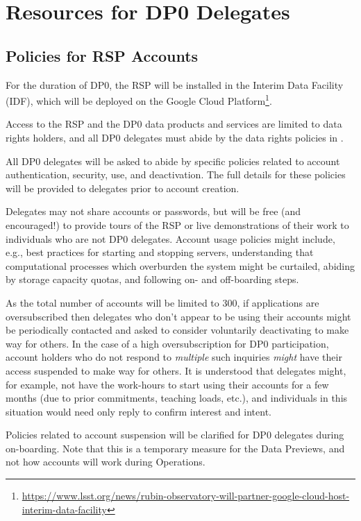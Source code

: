 \documentclass[DM,lsstdraft,authoryear,toc]{lsstdoc}
\begin{document}
\section{Resources for DP0 Delegates}\label{sec:res}

\subsection{Policies for RSP Accounts}\label{ssec:res_pol}

For the duration of DP0, the RSP will be installed in the Interim Data Facility (IDF), which will be deployed on the Google Cloud Platform\footnote{\url{https://www.lsst.org/news/rubin-observatory-will-partner-google-cloud-host-interim-data-facility}}.

Access to the RSP and the DP0 data products and services are limited to data rights holders, and all DP0 delegates must abide by the data rights policies in .

All DP0 delegates will be asked to abide by specific policies related to account authentication, security, use, and deactivation.
The full details for these policies will be provided to delegates prior to account creation. 

Delegates may not share accounts or passwords, but will be free (and encouraged!) to provide tours of the RSP or live demonstrations of their work to individuals who are not DP0 delegates.
Account usage policies might include, e.g., best practices for starting and stopping servers, understanding that computational processes which overburden the system might be curtailed, abiding by storage capacity quotas, and following on- and off-boarding steps.

As the total number of accounts will be limited to 300, if applications are oversubscribed then delegates who don't appear to be using their accounts might be periodically contacted and asked to consider voluntarily deactivating to make way for others.
In the case of a high oversubscription for DP0 participation, account holders who do not respond to \emph{multiple} such inquiries \emph{might} have their access suspended to make way for others.
It is understood that delegates might, for example, not have the work-hours to start using their accounts for a few months (due to prior commitments, teaching loads, etc.), and individuals in this situation would need only reply to confirm interest and intent. 

Policies related to account suspension will be clarified for DP0 delegates during on-boarding.
Note that this is a temporary measure for the Data Previews, and not how accounts will work during Operations.
\end{document}
